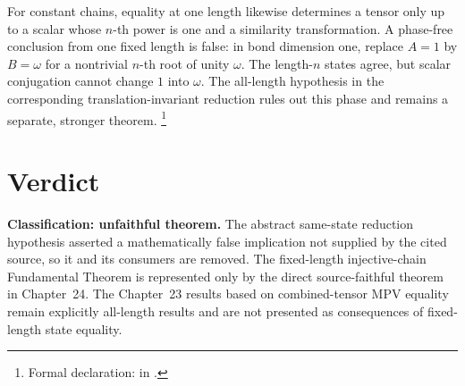 \documentclass{article}
\begin{document}
For constant chains, equality at one length likewise determines a tensor only
up to a scalar whose $n$-th power is one and a similarity transformation.  A
phase-free conclusion from one fixed length is false: in bond dimension one,
replace $A=1$ by $B=\omega$ for a nontrivial $n$-th root of unity $\omega$.
The length-$n$ states agree, but scalar conjugation cannot change $1$ into
$\omega$.  The all-length hypothesis in the corresponding
translation-invariant reduction rules out this phase and remains a separate,
stronger theorem.%
\footnote{Formal declaration:
     in
    .}

\section{Verdict}

\textbf{Classification: unfaithful theorem.}
The abstract same-state reduction hypothesis asserted a mathematically false
implication not supplied by the cited source, so it and its consumers are
removed.
The fixed-length injective-chain Fundamental Theorem is represented only by
the direct source-faithful theorem in Chapter~24.  The Chapter~23 results based
on combined-tensor MPV equality remain explicitly all-length results and are
not presented as consequences of fixed-length state equality.



\end{document}
